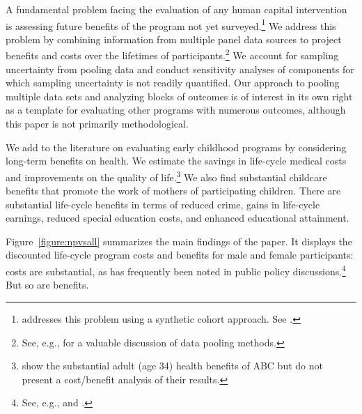 A fundamental problem facing the evaluation of any human capital intervention is assessing future benefits of the program not yet surveyed.\footnote{\cite{Mincer_1974_schooling} addresses this problem using a synthetic cohort approach. See \cite{Heckman_Lochner_ea_2006_HEE}.} We address this problem by combining information from multiple panel data sources to project benefits and costs over the lifetimes of participants.\footnote{See, e.g., \citet{Ridder_Moffitt_2007_hbk_metricsdata} for a valuable discussion of data pooling methods.} We account for sampling uncertainty from pooling data and conduct sensitivity analyses of components for which sampling uncertainty is not readily quantified. Our approach to pooling multiple data sets and analyzing blocks of outcomes is of interest in its own right as a template for evaluating other programs with numerous outcomes, although this paper is not primarily methodological.

We add to the literature on evaluating early childhood programs by considering long-term benefits on health. We estimate the savings in life-cycle medical costs and improvements on the quality of life.\footnote{\cite{Campbell_Conti_etal_2014_EarlyChildhoodInvestments} show the substantial adult (age 34) health benefits of ABC but do not present a cost/benefit analysis of their results.} We also find substantial childcare benefits that promote the work of mothers of participating children. There are substantial life-cycle benefits in terms of reduced crime, gains in life-cycle earnings, reduced special education costs, and enhanced educational attainment.

Figure~\ref{figure:npvsall} summarizes the main findings of the paper. It displays the discounted life-cycle program costs and benefits for male and female participants: costs are substantial, as has frequently been noted in public policy discussions.\footnote{See, e.g., \citet{Whitehurst_2014_Senate_Testimony} and \citet{Fox_News_2014_Head_Start_Effects}.} But so are benefits.

